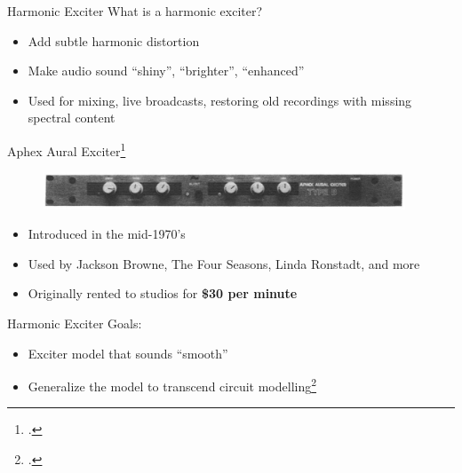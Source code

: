 \begin{frame}
\end{frame}

\begin{frame}{Harmonic Exciter}
    What is a harmonic exciter?\vspace{3ex}
    \begin{itemize}
        \item Add subtle harmonic distortion
        \item Make audio sound ``shiny'', ``brighter'', ``enhanced''
        \item Used for mixing, live broadcasts,
        restoring old recordings with missing spectral content
    \end{itemize}
\end{frame}

\begin{frame}{Aphex Aural Exciter\footcite{aphex}}
    \begin{figure}
        \centering
        \includegraphics[width=4.25in]{Figures/aphex.png}
    \end{figure}
    \begin{itemize}
        \item Introduced in the mid-1970's
        \item Used by Jackson Browne, The Four Seasons, Linda Ronstadt, and more
        \item Originally rented to studios for \textbf{\$30 per minute}
    \end{itemize}
\end{frame}

\begin{frame}{Harmonic Exciter}
    Goals:
    \vspace{3ex}
    \begin{itemize}
        \item Exciter model that sounds ``smooth''
        \item Generalize the model to transcend circuit modelling\footcite{giannoulis2012digital}
    \end{itemize}
\end{frame}

